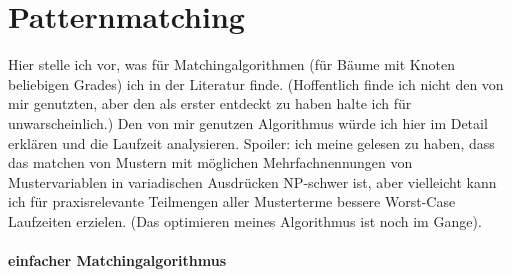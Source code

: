 \documentclass{article}
\begin{document}
\section{Patternmatching}
Hier stelle ich vor, was für Matchingalgorithmen (für Bäume mit Knoten beliebigen Grades) ich in der Literatur finde. (Hoffentlich finde ich nicht den von mir genutzten, aber den als erster entdeckt zu haben halte ich für unwarscheinlich.)
Den von mir genutzen Algorithmus würde ich hier im Detail erklären und die Laufzeit analysieren. Spoiler: ich meine gelesen zu haben, dass das matchen von Mustern mit möglichen Mehrfachnennungen von Mustervariablen in variadischen Ausdrücken NP-schwer ist, aber vielleicht kann ich für praxisrelevante Teilmengen aller Musterterme bessere Worst-Case Laufzeiten erzielen. (Das optimieren meines Algorithmus ist noch im Gange).
\\~\\

\textbf{einfacher Matchingalgorithmus}
\end{document}
